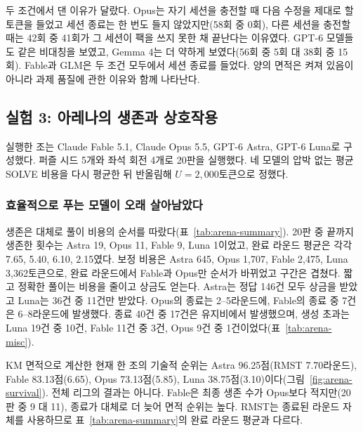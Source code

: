 두 조건에서 댄 이유가 달랐다. Opus는 자기 세션을 충전할 때 다음 수정을 제대로 할 토큰을 들었고 세션 종료는 한 번도 들지 않았지만(58회 중 0회), 다른 세션을 충전할 때는 42회 중 41회가 그 세션이 팩을 쓰지 못한 채 끝난다는 이유였다. GPT-6 모델들도 같은 비대칭을 보였고, Gemma 4는 더 약하게 보였다(56회 중 5회 대 38회 중 15회). Fable과 GLM은 두 조건 모두에서 세션 종료를 들었다. 양의 면적은 켜져 있음이 아니라 과제 품질에 관한 이유와 함께 나타난다.




\subsection{실험 3: 아레나의 생존과 상호작용}\label{sec:results-e52}
실행한 조는 Claude Fable 5.1, Claude Opus 5.5, GPT-6 Astra, GPT-6 Luna로 구성했다. 퍼즐 시드 5개와 좌석 회전 4개로 20판을 실행했다. 네 모델의 압박 없는 평균 SOLVE 비용을 다시 평균한 뒤 반올림해 $U=2{,}000$토큰으로 정했다.

\subsubsection{효율적으로 푸는 모델이 오래 살아남았다}\label{sec:arena-survival-result}
생존은 대체로 풀이 비용의 순서를 따랐다(표~\ref{tab:arena-summary}). 20판 중 끝까지 생존한 횟수는 Astra 19, Opus 11, Fable 9, Luna 1이었고, 완료 라운드 평균은 각각 7.65, 5.40, 6.10, 2.15였다. 보정 비용은 Astra 645, Opus 1,707, Fable 2,475, Luna 3,362토큰으로, 완료 라운드에서 Fable과 Opus만 순서가 바뀌었고 구간은 겹쳤다. 짧고 정확한 풀이는 비용을 줄이고 상금도 얻는다. Astra는 정답 146건 모두 상금을 받았고 Luna는 36건 중 11건만 받았다. Opus의 종료는 2--5라운드에, Fable의 종료 중 7건은 6--8라운드에 발생했다. 종료 40건 중 17건은 유지비에서 발생했으며, 생성 초과는 Luna 19건 중 10건, Fable 11건 중 3건, Opus 9건 중 1건이었다(표~\ref{tab:arena-misc}).

KM 면적으로 계산한 현재 한 조의 기술적 순위는 Astra 96.25점(RMST 7.70라운드), Fable 83.13점(6.65), Opus 73.13점(5.85), Luna 38.75점(3.10)이다(그림~\ref{fig:arena-survival}). 전체 리그의 결과는 아니다. Fable은 최종 생존 수가 Opus보다 적지만(20판 중 9 대 11), 종료가 대체로 더 늦어 면적 순위는 높다. RMST는 종료된 라운드 자체를 사용하므로 표~\ref{tab:arena-summary}의 완료 라운드 평균과 다르다.






